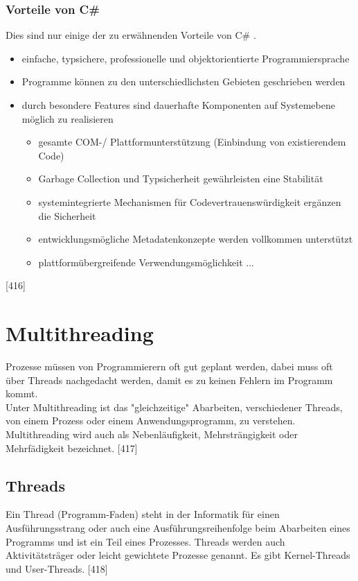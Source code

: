 \documentclass[12pt,a4paper]{report}
\begin{document}
\begin{onehalfspace}
\subsubsection{Vorteile von C\#}
Dies sind nur einige der zu erwähnenden Vorteile von C\# .
\begin{itemize}
\item einfache, typsichere, professionelle und objektorientierte Programmiersprache
\item Programme können zu den unterschiedlichsten Gebieten geschrieben werden
\item durch besondere Features sind dauerhafte Komponenten auf Systemebene möglich zu realisieren
\begin{itemize}
\item gesamte COM-/ Plattformunterstützung (Einbindung von existierendem Code)
\item Garbage Collection und Typsicherheit gewährleisten eine Stabilität
\item systemintegrierte Mechanismen für Codevertrauenswürdigkeit ergänzen die Sicherheit
\item entwicklungsmögliche Metadatenkonzepte werden vollkommen unterstützt
\item plattformübergreifende Verwendungsmöglichkeit ...
\end{itemize}
\end{itemize}
[416]
\section{Multithreading}
Prozesse müssen von Programmierern oft gut geplant werden, dabei muss oft über Threads nachgedacht werden, damit es zu keinen Fehlern im Programm kommt.\\

Unter Multithreading ist das "{}gleichzeitige"{} Abarbeiten, verschiedener Threads, von einem Prozess oder einem Anwendungsprogramm, zu verstehen. Multithreading wird auch als Nebenläufigkeit, Mehrsträngigkeit oder Mehrfädigkeit bezeichnet. [417]

\subsection{Threads}
Ein Thread (Programm-Faden) steht in der Informatik für einen Ausführungsstrang oder auch eine Ausführungsreihenfolge beim Abarbeiten eines Programms und ist ein Teil eines Prozesses. Threads werden auch Aktivitätsträger oder leicht gewichtete Prozesse genannt. Es gibt Kernel-Threads und User-Threads. [418]


\end{onehalfspace}
\end{document}
